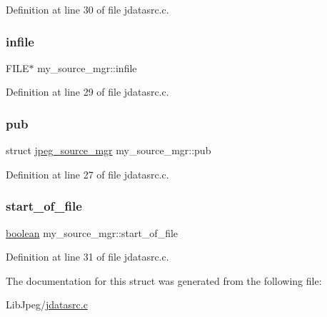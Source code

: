 Definition at line 30 of file jdatasrc.\+c.

\mbox{\label{structmy__source__mgr_a157a49dcdfd5723e566b1b8a35394a04}} 
\subsubsection{\texorpdfstring{infile}{infile}}
{\footnotesize\ttfamily F\+I\+LE$\ast$ my\+\_\+source\+\_\+mgr\+::infile}



Definition at line 29 of file jdatasrc.\+c.

\mbox{\label{structmy__source__mgr_a8572f33f87bec948592001edea12680f}} 
\subsubsection{\texorpdfstring{pub}{pub}}
{\footnotesize\ttfamily struct \mbox{\hyperlink{structjpeg__source__mgr}{jpeg\+\_\+source\+\_\+mgr}} my\+\_\+source\+\_\+mgr\+::pub}



Definition at line 27 of file jdatasrc.\+c.

\mbox{\label{structmy__source__mgr_a5c505c9008db53bb3ce07ed8ae3872a9}} 
\subsubsection{\texorpdfstring{start\_of\_file}{start\_of\_file}}
{\footnotesize\ttfamily \mbox{\hyperlink{jmorecfg_8h_a7c6368b321bd9acd0149b030bb8275ed}{boolean}} my\+\_\+source\+\_\+mgr\+::start\+\_\+of\+\_\+file}



Definition at line 31 of file jdatasrc.\+c.



The documentation for this struct was generated from the following file\+:\begin{DoxyCompactItemize}
\item 
Lib\+Jpeg/\mbox{\hyperlink{jdatasrc_8c}{jdatasrc.\+c}}\end{DoxyCompactItemize}
